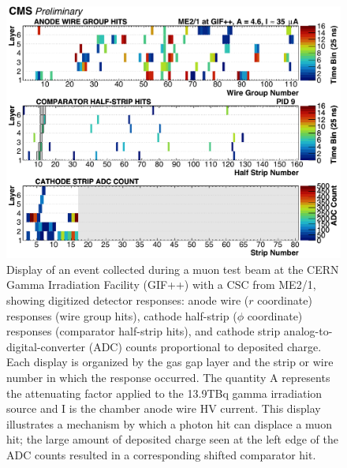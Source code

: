 
\begin{figure}[htbp]
	\centering
	\includegraphics[width=\dummyFigWidth]{figures/neutron/ED_GIF_3384_ME21_9.pdf}
  \caption[Display of an event collected during a muon test beam at the CERN Gamma Irradiation Facility (GIF++) with a CSC from ME2/1.]{Display of an event collected during a muon test beam at the CERN Gamma Irradiation Facility (GIF++) with a CSC from ME2/1, showing digitized detector responses: anode wire ($r$ coordinate) responses (wire group hits), cathode half-strip ($\phi$ coordinate) responses (comparator half-strip hits), and cathode strip analog-to-digital-converter (ADC) counts proportional to deposited charge. Each display is organized by the gas gap layer and the strip or wire number in which the response occurred. The quantity A represents the attenuating factor applied to the 13.9\unit{TBq}  gamma irradiation source and I is the chamber anode wire HV current. This display illustrates a mechanism by which a photon hit can displace a muon hit; the large amount of deposited charge seen at the left edge of the ADC counts resulted in a corresponding shifted comparator hit.}
	\label{fig:ed}
\end{figure}

